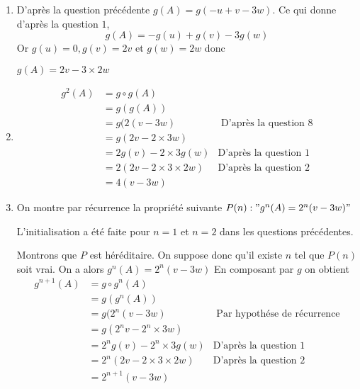 \documentclass[a4paper, 11pt,reqno]{article}
\begin{document}
\begin{correction}
\begin{enumerate}
\item D'après la question précédente $g(A) = g(-u+v-3w) $. Ce qui donne d'après la question $1$, 
$$g(A) = -g(u) +g(v) - 3g(w)$$
Or $g(u)=0, g(v)=2v $ et $g(w)=2w$ donc 

$g(A)= 2v -3 \times 2w$

\item 
\begin{align*}
g^2 (A) &= g\circ g(A)\\
			&= g(g(A))\\
			&= g( 2 (v-3w) & \text{ D'après la question 8}\\
			&= g(2v-2\times 3 w )\\
			&=2g(v) -2\times 3 g(w) & \text{D'après la question 1}		\\
			&=2 (2 v- 2 \times 3 \times 2w )& 	\text{D'après la question 2}		\\
			&= 4 (v-3w)
\end{align*}

\item On montre par récurrence la propriété  suivante 
$P(n) : " g^n (A) = 2^n (v-3w)"$

L'initialisation a été faite pour $n=1$ et $n=2$ dans les questions précédentes. 

Montrons que $P$ est héréditaire. On suppose donc qu'il existe $n$ tel que $P(n)$ soit vrai. On a alors 
$g^n(A) =2^n(v-3w)$ En composant par $g$ on obtient 
\begin{align*}
g^{n+1} (A) &= g\circ g^n(A)\\
			&= g(g^n(A))\\
			&= g( 2^n (v-3w) & \text{ Par hypothése de récurrence}\\
			&= g(2^nv-2^n\times 3 w )\\
			&=2^ng(v) -2^n\times 3 g(w) & \text{D'après la question 1}		\\
			&=2^n (2 v- 2 \times 3 \times 2w) & 	\text{D'après la question 2}		\\
			&= 2^{n+1} (v-3w)
\end{align*}


\end{enumerate}
\end{correction}
\end{document}
